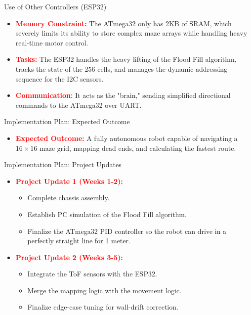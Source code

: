 \documentclass{beamer}
\begin{document}
\begin{frame}{Use of Other Controllers (ESP32)}
  \transfade[duration=0.1]
  \begin{itemize}[<+->]
    \item \textcolor{red}{\textbf{Memory Constraint:}} The ATmega32 only has 2KB of SRAM, which severely limits its ability to store complex maze arrays while handling heavy real-time motor control.
    \item \textcolor{red} {\textbf{Tasks:}} The ESP32 handles the heavy lifting of the Flood Fill algorithm, tracks the state of the 256 cells, and manages the dynamic addressing sequence for the I2C sensors.
    \item \textcolor{red} {\textbf{Communication:}} It acts as the "brain," sending simplified directional commands to the ATmega32 over UART.
  \end{itemize}
\end{frame}

\begin{frame}{Implementation Plan: Expected Outcome}
  \transfade[duration=0.1]
  \begin{itemize}[<+->]
    \item \textcolor{red}{\textbf{Expected Outcome:}} A fully autonomous robot capable of navigating a $16 \times 16$ maze grid, mapping dead ends, and calculating the fastest route.
  \end{itemize}
\end{frame}

\begin{frame}{Implementation Plan: Project Updates}
  \transfade[duration=0.1]
  \begin{itemize}[<+->]
    \item \textcolor{red}{\textbf{Project Update 1 (Weeks 1-2):}}
    \begin{itemize}[<+->]
      \item Complete chassis assembly.
      \item Establish PC simulation of the Flood Fill algorithm.
      \item Finalize the ATmega32 PID controller so the robot can drive in a perfectly straight line for 1 meter.
    \end{itemize}
    \item \textcolor{red}{\textbf{Project Update 2 (Weeks 3-5):}}
    \begin{itemize}[<+->]
      \item Integrate the ToF sensors with the ESP32.
      \item Merge the mapping logic with the movement logic.
      \item Finalize edge-case tuning for wall-drift correction.
    \end{itemize}
  \end{itemize}
\end{frame}
\end{document}
